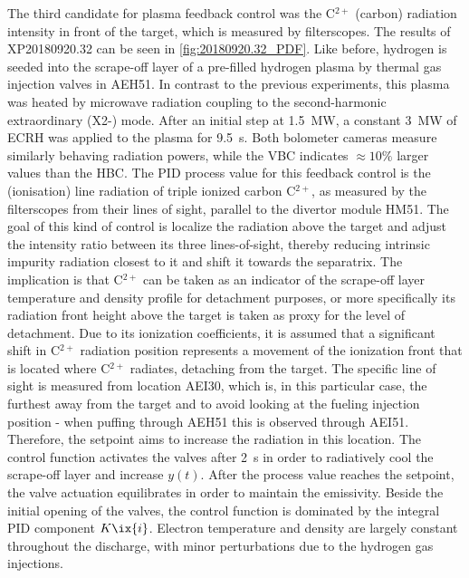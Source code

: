                 The third candidate for plasma feedback control was the C$^{2+}$ (carbon) radiation intensity in front of the target, which is measured by filterscopes. The results of XP20180920.32 can be seen in \cref{fig:20180920.32_PDF}. Like before, hydrogen is seeded into the scrape-off layer of a pre-filled hydrogen plasma by thermal gas injection valves in AEH51. In contrast to the previous experiments, this plasma was heated by microwave radiation coupling to the second-harmonic extraordinary (X2-) mode. After an initial step at \SI{1.5}{\mega\watt}, a constant \SI{3}{\mega\watt} of ECRH was applied to the plasma for \SI{9.5}{\second}. Both bolometer cameras measure similarly behaving radiation powers, while the VBC indicates $\approx10\%$ larger values than the HBC. The PID process value for this feedback control is the (ionisation) line radiation of triple ionized carbon C$^{2+}$, as measured by the filterscopes from their lines of sight, parallel to the divertor module HM51. The goal of this kind of control is localize the radiation above the target and adjust the intensity ratio between its three lines-of-sight, thereby reducing intrinsic impurity radiation closest to it and shift it towards the separatrix. The implication is that C$^{2+}$ can be taken as an indicator of the scrape-off layer temperature and density profile for detachment purposes, or more specifically its radiation front height above the target is taken as proxy for the level of detachment. Due to its ionization coefficients, it is assumed that a significant shift in C$^{2+}$ radiation position represents a movement of the ionization front that is located where C$^{2+}$ radiates, detaching from the target. The specific line of sight is measured from location AEI30, which is, in this particular case, the furthest away from the target and to avoid looking at the fueling injection position - when puffing through AEH51 this is observed through AEI51. Therefore, the setpoint aims to increase the radiation in this location. The control function activates the valves after \SI{2}{\second} in order to radiatively cool the scrape-off layer and increase $y\left(t\right)$. After the process value reaches the setpoint, the valve actuation equilibrates in order to maintain the emissivity. Beside the initial opening of the valves, the control function is dominated by the integral PID component $K\ix{i}$. Electron temperature and density are largely constant throughout the discharge, with minor perturbations due to the hydrogen gas injections.\\%
%
